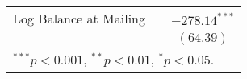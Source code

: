 \documentclass{beamer}
\begin{document}
{{\begin{table}[htbp]
\begin{center}
\begin{tabular}{l c c }
Log Balance at Mailing &                   & $-278.14^{***}$   \\
                       &                   & $(64.39)$         \\
\hline
\multicolumn{3}{l}{\scriptsize{$^{***}p<0.001$, $^{**}p<0.01$, $^*p<0.05$.}}
\end{tabular}
\end{center}
\end{table}
}}


\end{document}
